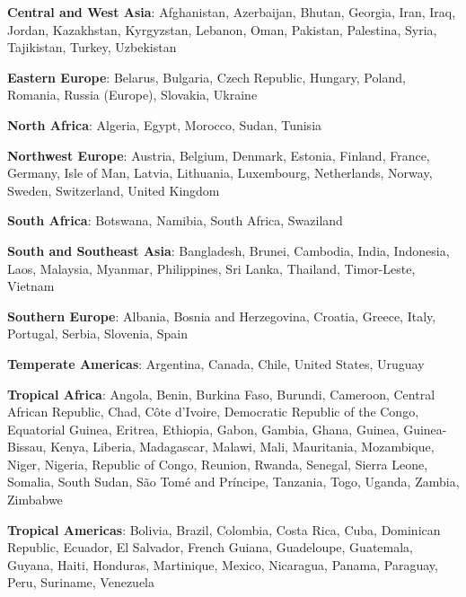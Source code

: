 \item \textbf{Central and West Asia}: Afghanistan, Azerbaijan, Bhutan, Georgia, Iran, Iraq, Jordan, Kazakhstan, Kyrgyzstan, Lebanon, Oman, Pakistan, Palestina, Syria, Tajikistan, Turkey, Uzbekistan
\item \textbf{Eastern Europe}: Belarus, Bulgaria, Czech Republic, Hungary, Poland, Romania, Russia (Europe), Slovakia, Ukraine
\item \textbf{North Africa}: Algeria, Egypt, Morocco, Sudan, Tunisia
\item \textbf{Northwest Europe}: Austria, Belgium, Denmark, Estonia, Finland, France, Germany, Isle of Man, Latvia, Lithuania, Luxembourg, Netherlands, Norway, Sweden, Switzerland, United Kingdom
\item \textbf{South Africa}: Botswana, Namibia, South Africa, Swaziland
\item \textbf{South and Southeast Asia}: Bangladesh, Brunei, Cambodia, India, Indonesia, Laos, Malaysia, Myanmar, Philippines, Sri Lanka, Thailand, Timor-Leste, Vietnam
\item \textbf{Southern Europe}: Albania, Bosnia and Herzegovina, Croatia, Greece, Italy, Portugal, Serbia, Slovenia, Spain
\item \textbf{Temperate Americas}: Argentina, Canada, Chile, United States, Uruguay
\item \textbf{Tropical Africa}: Angola, Benin, Burkina Faso, Burundi, Cameroon, Central African Republic, Chad, Côte d'Ivoire, Democratic Republic of the Congo, Equatorial Guinea, Eritrea, Ethiopia, Gabon, Gambia, Ghana, Guinea, Guinea-Bissau, Kenya, Liberia, Madagascar, Malawi, Mali, Mauritania, Mozambique, Niger, Nigeria, Republic of Congo, Reunion, Rwanda, Senegal, Sierra Leone, Somalia, South Sudan, São Tomé and Príncipe, Tanzania, Togo, Uganda, Zambia, Zimbabwe
\item \textbf{Tropical Americas}: Bolivia, Brazil, Colombia, Costa Rica, Cuba, Dominican Republic, Ecuador, El Salvador, French Guiana, Guadeloupe, Guatemala, Guyana, Haiti, Honduras, Martinique, Mexico, Nicaragua, Panama, Paraguay, Peru, Suriname, Venezuela

